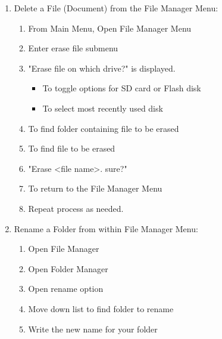 \documentclass[10pt,letterpaper,twoside]{report}
\begin{document}
{\begin{enumerate}
	\item Delete a File (Document) from the File Manager Menu:
	      \begin{enumerate}
		      \item From Main Menu, Open File Manager Menu 
		      \item Enter erase file submenu 
		      \item "Erase file on which drive?" is displayed.
		            \begin{itemize}
			            \item To toggle options for SD card or Flash disk 
			            \item To select most recently used disk 
		            \end{itemize}
		      \item To find folder containing file to be erased 
		      \item To find file to be erased 
		      \item "Erase <file name>. sure?" 
		      \item To return to the File Manager Menu 
		      \item Repeat process as needed.
	      \end{enumerate}
	\item Rename a Folder from within File Manager Menu:
	      \begin{enumerate}
		      \item Open File Manager 
		      \item Open Folder Manager 
		      \item Open rename option 
		      \item Move down list to find folder to rename 
		      \item Write the new name for your folder

\end{enumerate}
\end{enumerate}}
\end{document}
